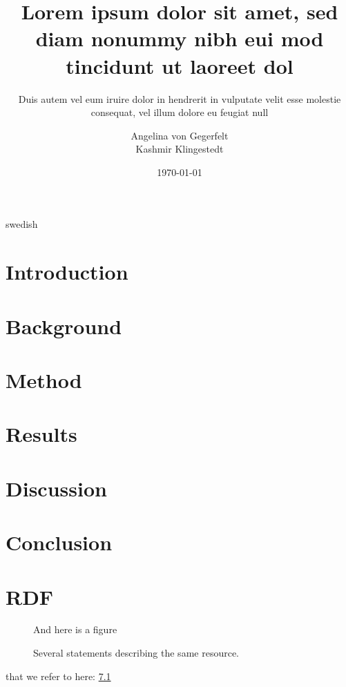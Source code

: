 \documentclass[a4paper,12pt]{kth-mag}
\title{Lorem ipsum dolor sit amet, sed diam nonummy nibh eui
       mod tincidunt ut laoreet dol}
\subtitle{Duis autem vel eum iruire dolor in hendrerit in
          vulputate velit esse molestie consequat, vel illum
          dolore eu feugiat null}
\author{Angelina von Gegerfelt\\Kashmir Klingestedt}
\date{\today}
\begin{document}
\frontmatter
\pagestyle{empty}
\removepagenumbers
\maketitle
{}

\begin{abstract}
\end{abstract}

\begin{foreignabstract}{swedish}
\end{foreignabstract}
\newpage

\tableofcontents*
\mainmatter
\pagestyle{newchap}

\chapter{Introduction}


\chapter{Background}


\chapter{Method}


\chapter{Results}


\chapter{Discussion}


\chapter{Conclusion}


\newpage
{}


\appendix
\addappheadtotoc
\chapter{RDF}\label{appA}

\begin{figure}[ht]
\begin{center}
And here is a figure
\caption{\small{Several statements describing the same resource.}}\label{RDF_4}
\end{center}
\end{figure}

that we refer to here: \ref{RDF_4}
\end{document}
